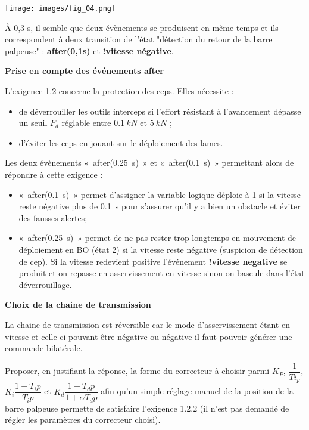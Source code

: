 \documentclass[11pt]{article}
\begin{document}
\begin{UPSTIcorrige}
\begin{center}
\texttt{[image: images/fig\_04.png]}
\end{center}

À 0,3 s, il semble que deux évènements se produisent en même temps et ils correspondent à deux transition de l'état "détection du retour de la barre palpeuse" : \textbf{after(0,1s)} et \textbf{!vitesse négative}.

\textbf{Prise en compte des événements after}

L'exigence 1.2 concerne la protection des ceps. Elles nécessite :
\begin{itemize}
\item de déverrouiller les outils interceps si l'effort résistant à l'avancement dépasse un seuil  $F_d$ réglable entre $\SI{0,1}{kN}$ et $\SI{5}{kN}$ ;
\item d'éviter les ceps en jouant sur le déploiement des lames.
\end{itemize}

Les deux évènements «~after(\SI{0,25}{s})~» et «~after(\SI{0,1}{s})~» permettant alors de répondre à cette exigence : 
\begin{itemize}
\item «~after(\SI{0,1}{s})~» permet d'assigner la variable logique déploie à 1 si la vitesse reste négative plus de \SI{0,1}{s} pour s'assurer qu'il y a bien un obstacle et éviter des fausses alertes;
\item «~after(\SI{0,25}{s})~» permet de ne pas rester trop longtemps en mouvement de déploiement en BO (état 2) si la vitesse reste négative (suspicion de détection de cep). Si la vitesse redevient positive l’événement \textbf{!vitesse negative} se produit et on repasse en asservissement en vitesse sinon on bascule dans l'état déverrouillage.
\end{itemize}

\textbf{Choix de la chaine de transmission}


La chaine de transmission est réversible car le mode d'asservissement étant en vitesse et celle-ci pouvant être négative ou négative il faut pouvoir générer une commande bilatérale.


\end{UPSTIcorrige}





\UPSTIquestion  Proposer, en justifiant la réponse, la forme du correcteur à choisir parmi $K_P$, $\dfrac{1}{Ti_p}$, $K_i \dfrac{1+T_i p}{T_i p}$ et $K_d \dfrac{1+T_d p}{1+\alpha T_d p}$ afin qu’un simple réglage manuel de la position de la barre palpeuse permette de satisfaire l’exigence 1.2.2 (il n’est pas demandé de régler les paramètres du correcteur choisi).
\end{document}
